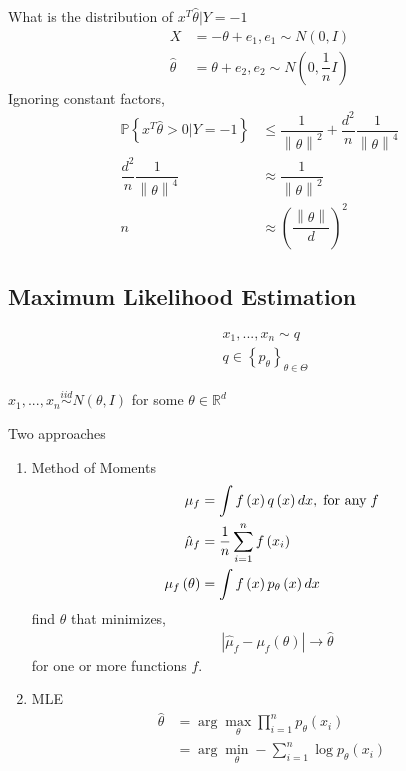 \documentclass{article}
\begin{document}
What is the distribution of $x^{T} \hat{\theta} | Y = -1$
\begin{align*}
X  &= -\theta + e_{1}, e_{1} \sim  N\left(0, I \right)
\\ \hat{\theta} &= \theta + e_{2}, e_{2} \sim  N\left(0, \dfrac{1}{n} I \right)
\end{align*}
Ignoring constant factors,
\begin{align*}
\mathbb{P}\left\{x^{T} \hat{\theta} > 0 | Y = -1\right\} &\leq  \dfrac{1}{\left\|\theta\right\|^{2}} + \dfrac{d^{2}}{n} \dfrac{1}{\left\|\theta\right\|^{4}}
\\ \dfrac{d^{2}}{n} \dfrac{1}{\left\|\theta\right\|^{4}} &\approx \dfrac{1}{\left\|\theta\right\|^{2}}
\\ n  &\approx \left(\dfrac{\left\|\theta\right\|}{d}\right)^{2}
\end{align*}


\subsection{Maximum Likelihood Estimation}
\begin{align*}
&x_{1}, ..., x_{n} \sim  q 
\\ &q  \in \left\{p_{\theta}\right\}_{\theta \in \Theta}
\end{align*}
\begin{eg} \label{eg:normalmle} 
$x_{1}, ..., x_{n} \stackrel{iid}{\sim} N\left(\theta, I \right)$ for some $\theta \in \mathbb{R}^{d}$
\end{eg}
Two approaches
\begin{enumerate}
\item Method of Moments
\begin{align*}
\mu_{f} &= \displaystyle\int f\left(x\right) q\left(x\right) dx, \text{\;for any\;} f 
\\ \hat{\mu}_{f} &= \dfrac{1}{n} \displaystyle\sum_{i=1}^{n} f\left(x_{i}\right)
\\ \mu_{f}\left(\theta\right) &= \displaystyle\int f\left(x\right) p_{\theta}\left(x\right) dx
\end{align*}
find $\theta$ that minimizes,
\begin{align*}
&| \hat{\mu}_{f} - \mu_{f}\left(\theta\right) | \to  \hat{\theta}
\end{align*}
for one or more functions $f. $
\item MLE
\begin{align*}
\hat{\theta} &= \arg\displaystyle\max_{\theta} \displaystyle\prod_{i=1}^{n} p_{\theta}\left(x_{i}\right)
\\ &= \arg\displaystyle\min_{\theta} - \displaystyle\sum_{i=1}^{n} \log p_{\theta}\left(x_{i}\right)
\end{align*}

\end{enumerate}
\end{document}
